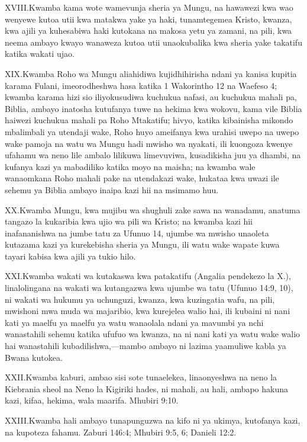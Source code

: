 \lettrine{XVIII.} Kwamba kama wote wamevunja sheria ya Mungu, na hawawezi kwa wao wenyewe kutoa utii kwa matakwa yake ya haki, tunamtegemea Kristo, kwanza, kwa ajili ya kuhesabiwa haki kutokana na makosa yetu ya zamani, na pili, kwa neema ambayo kwayo wanaweza kutoa utii unaokubalika kwa sheria yake takatifu katika wakati ujao.


\lettrine{XIX.} Kwamba Roho wa Mungu aliahidiwa kujidhihirisha ndani ya kanisa kupitia karama Fulani, imeorodheshwa hasa katika 1 Wakorintho 12 na Waefeso 4; kwamba karama hizi sio iliyokusudiwa kuchukua nafasi, au kuchukua mahali pa, Biblia, ambayo inatosha kutufanya tuwe na hekima kwa wokovu, kama vile Biblia haiwezi kuchukua mahali pa Roho Mtakatifu; hivyo, katika kibainisha mikondo mbalimbali ya utendaji wake, Roho huyo ameifanya kwa urahisi uwepo na uwepo wake pamoja na watu wa Mungu hadi mwisho wa nyakati, ili kuongoza kwenye ufahamu wa neno lile ambalo lilikuwa limevuviwa, kusadikisha juu ya dhambi, na kufanya kazi ya mabadiliko katika moyo na maisha; na kwamba wale wanaomkana Roho mahali pake na utendakazi wake, hukataa kwa uwazi ile sehemu ya Biblia ambayo inaipa kazi hii na msimamo huu.


\lettrine{XX.} Kwamba Mungu, kwa mujibu wa shughuli zake sawa na wanadamu, anatuma tangazo la kukaribia kwa ujio wa pili wa Kristo; na kwamba kazi hii inafananishwa na jumbe tatu za Ufunuo 14, ujumbe wa mwisho unaoleta kutazama kazi ya kurekebisha sheria ya Mungu, ili watu wake wapate kuwa tayari kabisa kwa ajili ya tukio hilo.


\lettrine{XXI.} Kwamba wakati wa kutakaswa kwa patakatifu (Angalia pendekezo la X.), linalolingana na wakati wa kutangazwa kwa ujumbe wa tatu (Ufunuo 14:9, 10), ni wakati wa hukumu ya uchunguzi, kwanza, kwa kuzingatia wafu, na pili, mwishoni mwa muda wa majaribio, kwa kurejelea walio hai, ili kubaini ni nani kati ya maelfu ya maelfu ya watu wanaolala ndani ya mavumbi ya nchi wanastahili sehemu katika ufufuo wa kwanza, na ni nani kati ya watu wake walio hai wanastahili kubadilishwa,—mambo ambayo ni lazima yaamuliwe kabla ya Bwana kutokea.


\lettrine{XXII.} Kwamba kaburi, ambao sisi sote tunaelekea, linaonyeshwa na neno la Kiebrania sheol na Neno la Kigiriki hades, ni mahali, au hali, ambapo hakuna kazi, kifaa, hekima, wala maarifa. Mhubiri 9:10.


\lettrine{XXIII.} Kwamba hali ambayo tunapunguzwa na kifo ni ya ukimya, kutofanya kazi, na kupoteza fahamu. Zaburi 146:4; Mhubiri 9:5, 6; Danieli 12:2.


